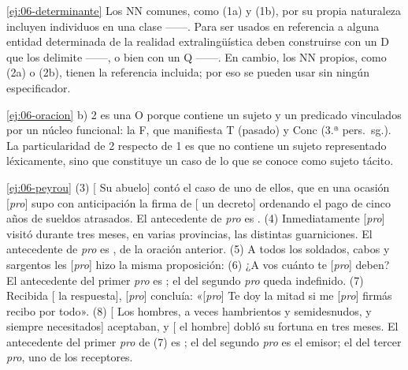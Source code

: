 \lecturasrecomendadas

\solucionario

\begin{solucion}{\ref{ej:06-determinante}}
Los NN comunes, como  (1a) y  (1b), por su propia
naturaleza incluyen individuos en una clase ------. Para
ser usados en referencia a alguna entidad determinada de la realidad
extralingüística deben construirse con un D que los delimite ------, o bien con un Q ------. En cambio, los NN propios, como  (2a) o
 (2b), tienen la referencia incluida; por eso se pueden usar
sin ningún especificador.
\end{solucion}

\begin{solucion}{\ref{ej:06-oracion}}
b) 2 es una O porque contiene un sujeto y un predicado vinculados por un núcleo
funcional: la F, que manifiesta T (pasado) y Conc (3.ª pers.~sg.). La
particularidad de 2 respecto de 1 es que no contiene un sujeto representado
léxicamente, sino que constituye un caso de lo que se conoce como sujeto tácito.
\end{solucion}

\begin{solucion}{\ref{ej:06-peyrou}}
(3) [ Su abuelo] contó el caso de uno de ellos, que en una
ocasión [\textit{pro}\etq{[3.ª sg.]}] supo con anticipación la firma de
[ un decreto] ordenando el pago de cinco años de sueldos atrasados. El
antecedente de \textit{pro} es . (4) Inmediatamente
[\textit{pro}\etq{[3.ª sg.]}] visitó durante tres meses, en varias
provincias, las distintas guarniciones. El antecedente de \textit{pro} es
, de la oración anterior. (5) A todos los soldados, cabos y
sargentos les [\textit{pro}\etq{[3.ª sg.]}] hizo la misma proposición:
(6) ¿A vos cuánto te [\textit{pro}\etq{[3.ª pl.]}] deben? El antecedente del
primer \textit{pro} es ; el del segundo \textit{pro} queda
indefinido. (7) Recibida [ la respuesta],
[\textit{pro}\etq{[3.ª sg.]}] concluía: «[\textit{pro}\etq{[1.ª sg.]}] Te
doy la mitad si me [\textit{pro}\etq{[2.ª sg.]}] firmás recibo por todo». (8)
[ Los hombres, a veces hambrientos y semidesnudos, y siempre
necesitados] aceptaban, y [ el hombre] dobló su fortuna en tres meses.
El antecedente del primer \textit{pro} de (7) es ; el del
segundo \textit{pro} es el emisor; el del tercer \textit{pro}, uno de los
receptores.
\end{solucion}

